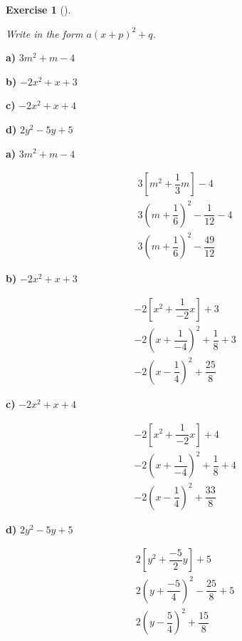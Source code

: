 \documentclass[
  letterpaper,
  DIV=11,
  numbers=noendperiod]{scrreprt}
\theoremstyle{definition}
\newtheorem{exercise}{Exercise}[chapter]
\theoremstyle{remark}
\begin{document}
\begin{exercise}[]\protect\hypertarget{exr-u6-15}{}\label{exr-u6-15}

\emph{Write in the form \(a(x+p)^2 + q\).}

\textbf{a)} \(\displaystyle 3m^2 + m - 4\)

\textbf{b)} \(\displaystyle -2x^2 + x + 3\)

\textbf{c)} \(\displaystyle -2x^2 + x + 4\)

\textbf{d)} \(\displaystyle 2y^2 - 5y + 5\)

\begin{tcolorbox}[enhanced jigsaw, opacitybacktitle=0.6, coltitle=black, arc=.35mm, colframe=quarto-callout-tip-color-frame, colback=white, bottomrule=.15mm, left=2mm, colbacktitle=quarto-callout-tip-color!10!white, titlerule=0mm, opacityback=0, title=\textcolor{quarto-callout-tip-color}{\faLightbulb}\hspace{0.5em}{🔍 View Solutions}, leftrule=.75mm, breakable, rightrule=.15mm, bottomtitle=1mm, toptitle=1mm, toprule=.15mm]

\textbf{a)} \(\displaystyle 3m^2 + m - 4\)

\begin{align*}
3\left[m^2 + \dfrac{1}{3}m\right] - 4 \\ 3\left(m + \dfrac{1}{6}\right)^2 - \dfrac{1}{12} - 4 \\ 3(m + \dfrac{1}{6})^2 - \dfrac{49}{12}
\end{align*}

\textbf{b)} \(\displaystyle -2x^2 + x + 3\)

\begin{align*}
-2\left[x^2 + \dfrac{1}{-2}x\right] + 3 \\ -2\left(x + \dfrac{1}{-4}\right)^2 + \dfrac{1}{8} + 3 \\ -2(x - \dfrac{1}{4})^2 + \dfrac{25}{8}
\end{align*}

\textbf{c)} \(\displaystyle -2x^2 + x + 4\)

\begin{align*}
-2\left[x^2 + \dfrac{1}{-2}x\right] + 4 \\ -2\left(x + \dfrac{1}{-4}\right)^2 + \dfrac{1}{8} + 4 \\ -2(x - \dfrac{1}{4})^2 + \dfrac{33}{8}
\end{align*}

\textbf{d)} \(\displaystyle 2y^2 - 5y + 5\)

\begin{align*}
2\left[y^2 + \dfrac{-5}{2}y\right] + 5 \\ 2\left(y + \dfrac{-5}{4}\right)^2 - \dfrac{25}{8} + 5 \\ 2(y - \dfrac{5}{4})^2 + \dfrac{15}{8}
\end{align*}

\end{tcolorbox}

\end{exercise}
\end{document}
